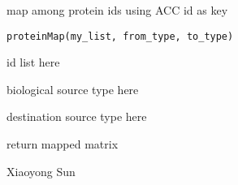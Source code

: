 \begin{Description}\relax
map among protein ids using ACC id as key
\end{Description}
\begin{Usage}
\begin{verbatim}
proteinMap(my_list, from_type, to_type)
\end{verbatim}
\end{Usage}
\begin{Arguments}
\begin{ldescription}
\item[\code{my\_list}] id list  here~~ 
\item[\code{from\_type}] biological source type  here~~ 
\item[\code{to\_type}] destination source type  here~~ 
\end{ldescription}
\end{Arguments}
\begin{Value}
return mapped matrix
\end{Value}
\begin{Author}\relax
Xiaoyong Sun
\end{Author}

